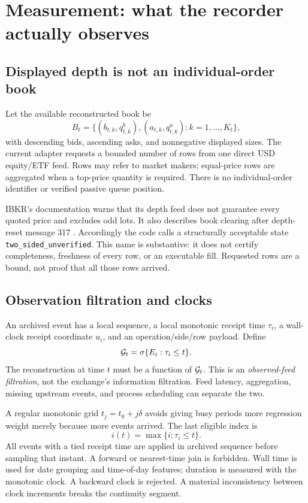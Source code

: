 \section{Measurement: what the recorder actually observes}
\subsection{Displayed depth is not an individual-order book}
Let the available reconstructed book be
\[
B_t=\{(b_{t,k},q^b_{t,k}),(a_{t,k},q^a_{t,k}): k=1,\ldots,K_t\},
\]
with descending bids, ascending asks, and nonnegative displayed sizes. The current adapter requests a bounded number of rows from one direct USD equity/ETF feed. Rows may refer to market makers; equal-price rows are aggregated when a top-price quantity is required. There is no individual-order identifier or verified passive queue position.

IBKR's documentation warns that its depth feed does not guarantee every quoted price and excludes odd lots. It also describes book clearing after depth-reset message 317 \citep{ibkrdepth}. Accordingly the code calls a structurally acceptable state \texttt{two\_sided\_unverified}. This name is substantive: it does not certify completeness, freshness of every row, or an executable fill. Requested rows are a bound, not proof that all those rows arrived.

\subsection{Observation filtration and clocks}
An archived event has a local sequence, a local monotonic receipt time $\tau_i$, a wall-clock receipt coordinate $u_i$, and an operation/side/row payload. Define
\[
\mathcal G_t=\sigma\{E_i:\tau_i\leq t\}.
\]
The reconstruction at time $t$ must be a function of $\mathcal G_t$. This is an \emph{observed-feed filtration}, not the exchange's information filtration. Feed latency, aggregation, missing upstream events, and process scheduling can separate the two.

A regular monotonic grid $t_j=t_0+j\delta$ avoids giving busy periods more regression weight merely because more events arrived. The last eligible index is
\begin{equation}
 i(t)=\max\{i:\tau_i\leq t\}.\label{eq:asof}
\end{equation}
All events with a tied receipt time are applied in archived sequence before sampling that instant. A forward or nearest-time join is forbidden. Wall time is used for date grouping and time-of-day features; duration is measured with the monotonic clock. A backward clock is rejected. A material inconsistency between clock increments breaks the continuity segment.

